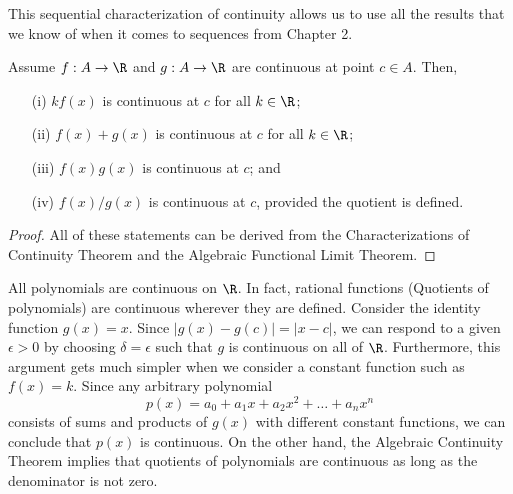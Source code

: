 This sequential characterization of continuity allows us to use all the results that we know of when it comes to sequences from Chapter 2. 


\begin{tcolorbox}
    \begin{thm} 
    Assume \( f: A \to \R  \) and \( g: A \to \R  \) are continuous at point \( c \in A  \). Then, 
    \begin{enumerate}
        \item[(i)] \( kf(x)  \) is continuous at \( c  \) for all \( k \in \R  \);
        \item[(ii)] \( f(x) + g(x) \) is continuous at \( c  \) for all \( k \in \R  \);
        \item[(iii)] \( f(x) g(x) \) is continuous at \( c  \); and 
        \item[(iv)] \( f(x) / g(x)  \) is continuous at \( c  \), provided the quotient is defined.
    \end{enumerate}
    \end{thm}
\end{tcolorbox}

\begin{proof}
All of these statements can be derived from the Characterizations of Continuity Theorem and the Algebraic Functional Limit Theorem.
\end{proof}


\begin{ex}
All polynomials are continuous on \( \R  \). In fact, rational functions (Quotients of polynomials) are continuous wherever they are defined. Consider the identity function \( g(x) = x  \). Since \( | g(x) - g(c) | = | x - c  |  \), we can respond to a given \( \epsilon > 0 \) by choosing \( \delta = \epsilon  \) such that \( g  \) is continuous on all of \( \R  \). Furthermore, this argument gets much simpler when we consider a constant function such as \( f(x) = k  \). Since any arbitrary polynomial 
\[  p(x) = a_0 + a_1 x + a_2 x^2 + \dots + a_n x^n \]
consists of sums and products of \( g(x) \) with different constant functions, we can conclude that \( p(x) \) is continuous. On the other hand, the Algebraic Continuity Theorem implies that quotients of polynomials are continuous as long as the denominator is not zero.
\end{ex}

